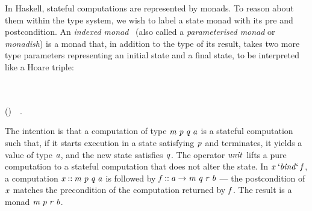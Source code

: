 In Haskell, stateful computations are represented by monads. To reason about
them within the type system, we wish to label a state monad with its pre and
postcondition. An \emph{indexed monad}~\cite{indexedmonad} (also called a
\emph{parameterised monad} or \emph{monadish}) is a monad that, in addition to
the type of its result, takes two more type parameters representing an initial
state and a final state, to be interpreted like a Hoare triple:
\begin{hscode}\SaveRestoreHook
{}%
%
%
\>[B]{}\;\;\;\<[E]%
\\
\>[B]{}\<[5]%
\>[5]{}\mathbin{::}\to {}\;\;\;\<[E]%
\\
\>[B]{}\<[5]%
\>[5]{}\mathbin{::}\;\;\;\to (\to {}\;\;\;)\to {}\;\;\;~~.{}\<[E]%
\ColumnHook
\end{hscode}\resethooks
The intention is that a computation of type \ensuremath{\Varid{m}\;\Varid{p}\;\Varid{q}\;\Varid{a}} is a stateful computation
such that, if it starts execution in a state satisfying \ensuremath{\Varid{p}} and terminates, it
yields a value of type \ensuremath{\Varid{a}}, and the new state satisfies \ensuremath{\Varid{q}}. The operator \ensuremath{\Varid{unit}}
lifts a pure computation to a stateful computation that does not alter the
state. In \ensuremath{\Varid{x}\mathbin{`\Varid{bind}`}\Varid{f}}, a computation \ensuremath{\Varid{x}\mathbin{::}\Varid{m}\;\Varid{p}\;\Varid{q}\;\Varid{a}} is followed by
\ensuremath{\Varid{f}\mathbin{::}\Varid{a}\to \Varid{m}\;\Varid{q}\;\Varid{r}\;\Varid{b}} --- the postcondition of \ensuremath{\Varid{x}} matches the precondition of
the computation returned by \ensuremath{\Varid{f}}. The result is a monad \ensuremath{\Varid{m}\;\Varid{p}\;\Varid{r}\;\Varid{b}}.

